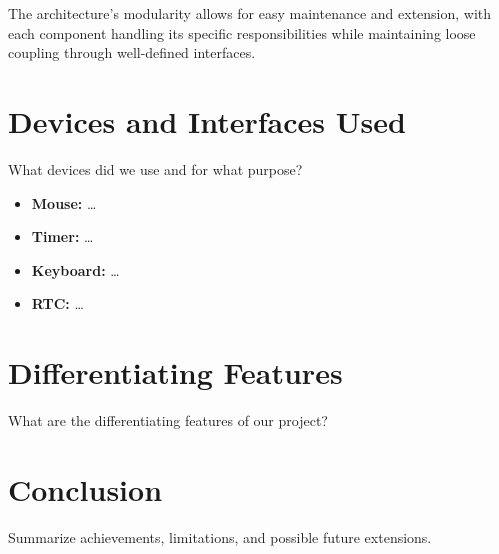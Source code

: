 \documentclass[12pt,a4paper]{article}
\begin{document}
The architecture's modularity allows for easy maintenance and extension, with each component handling its specific responsibilities while maintaining loose coupling through well-defined interfaces.

\section{Devices and Interfaces Used}
What devices did we use and for what purpose?
\begin{itemize}[itemsep=0.5em]
  \item \textbf{Mouse:} \ldots
  \item \textbf{Timer:} \ldots
  \item \textbf{Keyboard:} \ldots
  \item \textbf{RTC:} \ldots
\end{itemize}

\section{Differentiating Features}
What are the differentiating features of our project?

\section{Conclusion}
Summarize achievements, limitations, and possible future extensions.
\end{document}
